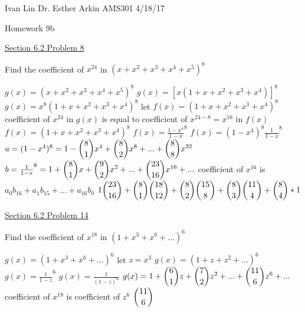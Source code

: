 \documentclass{article}
\begin{document}
Ivan Lin\newline{}
Dr. Esther Arkin\newline{}
AMS301\newline{}
4/18/17

\begin{center}
  Homework 9b
\end{center}

\underline{Section 6.2 Problem 8}

Find the coefficient of $x^{24}$ in $(x+x^2+x^3+x^4+x^5)^8$\newline{}

$g(x)=(x+x^2+x^3+x^4+x^5)^8$\newline{}
$g(x)=[x(1+x+x^2+x^3+x^4)]^8$\newline{}
$g(x)=x^8(1+x+x^2+x^3+x^4)^8$\newline{}
let $f(x)=(1+x+x^2+x^3+x^4)^8$\newline{}
coefficient of $x^{24}$ in $g(x)$ is equal to coefficient of $x^{24-8}=x^{16}$ in $f(x)$\newline{}
$f(x)=(1+x+x^2+x^3+x^4)^8$\newline{}
$f(x)=\frac{1-x^{4}}{1-x}^8$\newline{}
$f(x)=(1-x^4)^8\frac{1}{1-x}^8$\newline{}
$a=(1-x^4)^8=1-\dbinom{8}{1}x^4+\dbinom{8}{2}x^8+...+\dbinom{8}{8}x^{32}$\newline{}
$b=\frac{1}{1-x}^8=1+\dbinom{8}{1}x+\dbinom{9}{2}x^2+...+\dbinom{23}{16}x^{16}+...$\newline{}
coefficient of $x^{16}$ is $a_0b_{16}+a_1b_{15}+...+a_{16}b_0$\newline{}
$1\dbinom{23}{16}+\dbinom{8}{1}\dbinom{18}{12}+\dbinom{8}{2}\dbinom{15}{8}+\dbinom{8}{3}\dbinom{11}{4}+\dbinom{8}{4}*1$\newline{}

\underline{Section 6.2 Problem 14}

Find the coefficient of $x^{18}$ in $(1+x^3+x^6+...)^6$\newline{}

$g(x)=(1+x^3+x^6+...)^6$\newline{}
let $z=x^3$\newline{}
$g(x)=(1+z+z^2+...)^6$\newline{}
$g(x)=\frac{1}{1-z}^6$\newline{}
$g(x)=\frac{1}{(1-z)^6}$\newline{}
$g(x)=1+\dbinom{6}{1}z+\dbinom{7}{2}z^2+...+\dbinom{11}{6}z^6+...$\newline{}
coefficient of $x^{18}$ is coefficient of $z^6$\newline{}
$\dbinom{11}{6}$\newline{}
\end{document}
